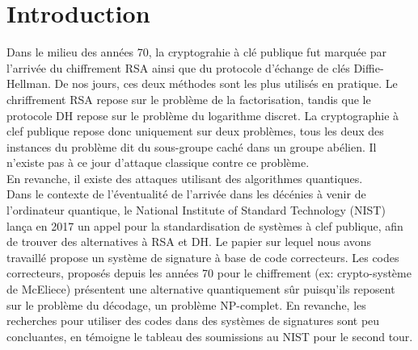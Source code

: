 \documentclass[12pt]{article}
\theoremstyle{plain}
\theoremstyle{definition}
\begin{document}
\newpage
\tableofcontents
\newpage

\section*{Introduction}
Dans le milieu des années 70, la cryptograhie à clé publique fut marquée par l'arrivée du chiffrement RSA ainsi que du protocole d'échange de clés Diffie-Hellman. De nos jours, ces deux méthodes sont les plus utilisés en pratique. Le chriffrement RSA repose sur le problème de la factorisation, tandis que le protocole DH repose sur le problème du logarithme discret. La cryptographie à clef publique repose donc uniquement sur deux problèmes, tous les deux des instances du problème dit du sous-groupe caché dans un groupe abélien. Il n’existe pas à ce jour d’attaque classique contre ce problème. \\ 
En revanche, il existe des attaques utilisant des algorithmes quantiques. \\
Dans le contexte de l'éventualité de l'arrivée dans les décénies à venir de l'ordinateur quantique, le National Institute of Standard Technology (NIST) lança en 2017 un appel pour la standardisation de systèmes à clef publique, afin de trouver des alternatives à RSA et DH.
Le papier sur lequel nous avons travaillé propose un système de signature à base de code correcteurs. Les codes correcteurs, proposés depuis les années 70 pour le chiffrement (ex: crypto-système de McEliece) présentent une alternative quantiquement sûr puisqu'ils reposent sur le problème du décodage, un problème NP-complet. En revanche, les recherches pour utiliser des codes dans des systèmes de signatures sont peu concluantes, en témoigne le tableau des soumissions au NIST pour le second tour. \\
\end{document}
